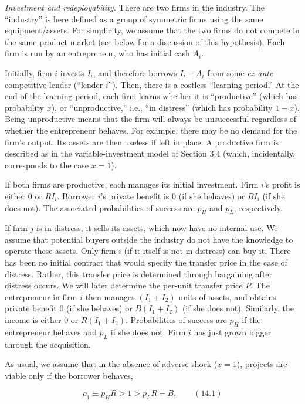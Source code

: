 \documentclass[11pt,a4paper]{article}
\begin{document}
\emph{Investment and redeployability.} There are two firms in the industry. The ``industry'' is here
defined as a group of symmetric firms using the same equipment/assets. For simplicity, we assume
that the two firms do not compete in the same product market (see below for a discussion of this
hypothesis). Each firm is run by an entrepreneur, who has initial cash \(A_i\).

Initially, firm \(i\) invests \(I_i\), and therefore borrows \(I_i - A_i\) from some \emph{ex ante}
competitive lender (``lender \(i\)''). Then, there is a costless ``learning period.'' At the end of
the learning period, each firm learns whether it is ``productive'' (which has probability \(x\)), or
``unproductive,'' i.e., ``in distress'' (which has probability \(1 - x\)). Being unproductive means
that the firm will always be unsuccessful regardless of whether the entrepreneur behaves. For
example, there may be no demand for the firm's output. Its assets are then useless if left in place.
A productive firm is described as in the variable-investment model of Section 3.4 (which,
incidentally, corresponds to the case \(x = 1\)).

If both firms are productive, each manages its initial investment. Firm \(i\)'s profit is either 0
or \(RI_i\). Borrower \(i\)'s private benefit is 0 (if she behaves) or \(BI_i\) (if she does not).
The associated probabilities of success are \(p_H\) and \(p_L\), respectively.

If firm \(j\) is in distress, it sells its assets, which now have no internal use. We assume that
potential buyers outside the industry do not have the knowledge to operate these assets. Only firm
\(i\) (if it itself is not in distress) can buy it. There has been no initial contract that would
specify the transfer price in the case of distress. Rather, this transfer price is determined
through bargaining after distress occurs. We will later determine the per-unit transfer price \(P\).
The entrepreneur in firm \(i\) then manages \((I_1 + I_2)\) units of assets, and obtains private
benefit 0 (if she behaves) or \(B(I_1 + I_2)\) (if she does not). Similarly, the income is either 0
or \(R(I_1 + I_2)\). Probabilities of success are \(p_H\) if the entrepreneur behaves and \(p_L\) if
she does not. Firm \(i\) has just grown bigger through the acquisition.

As usual, we assume that in the absence of adverse shock (\(x = 1\)), projects are viable only if
the borrower behaves,

\[\rho_1 \equiv p_H R > 1 > p_L R + B, \qquad (14.1)\]
\end{document}
